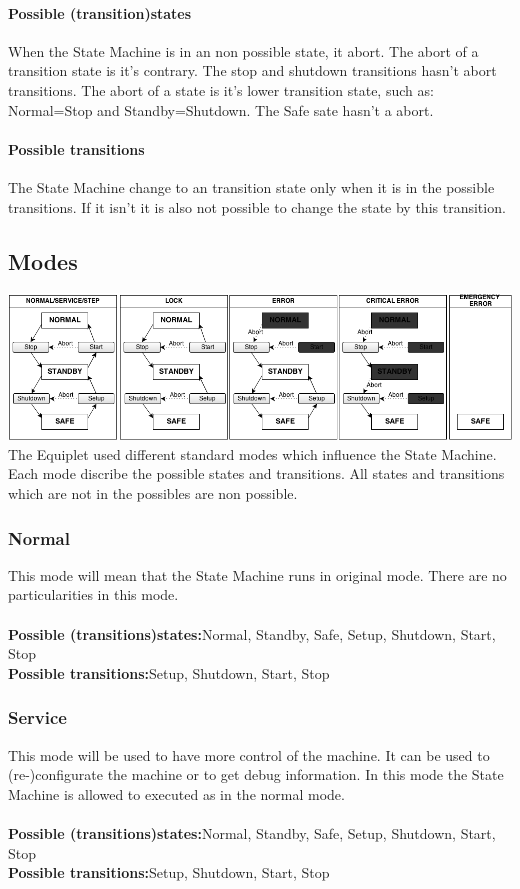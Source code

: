 \documentclass[12pt,a4paper]{report}
\begin{document}
\paragraph{Possible (transition)states}When the State Machine is in an non possible state, it abort. The abort of a transition state is it's contrary. The stop and shutdown transitions hasn't abort transitions. The abort of a state is it's lower transition state, such as: Normal=Stop and Standby=Shutdown. The Safe sate hasn't a abort.
\paragraph{Possible transitions}The State Machine change to an transition state only when it is in the possible transitions. If it isn't it is also not possible to change the state by this transition.

\subsection{Modes}
\includegraphics[width=1\textwidth]{pictures/modes.png}\\
The Equiplet used different standard modes which influence the State Machine. Each mode discribe the possible states and transitions. All states and transitions which are not in the possibles are non possible. 

\subsubsection{Normal}This mode will mean that the State Machine runs in original mode. There are no particularities in this mode.\\\\
\textbf{Possible (transitions)states:}Normal, Standby, Safe, Setup, Shutdown, Start, Stop\\
\textbf{Possible transitions:}Setup, Shutdown, Start, Stop

\subsubsection{Service}This mode will be used to have more control of the machine. It can be used to (re-)configurate the machine or to get debug information. In this mode the State Machine is allowed to executed as in the normal mode.\\\\
\textbf{Possible (transitions)states:}Normal, Standby, Safe, Setup, Shutdown, Start, Stop\\
\textbf{Possible transitions:}Setup, Shutdown, Start, Stop
\end{document}

